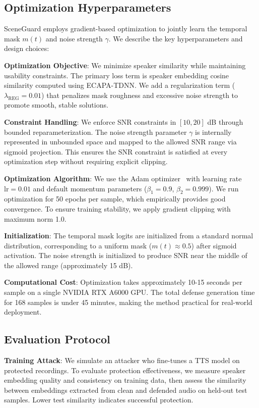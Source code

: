 \subsection{Optimization Hyperparameters}

SceneGuard employs gradient-based optimization to jointly learn the temporal mask $m(t)$ and noise strength $\gamma$. We describe the key hyperparameters and design choices:

\textbf{Optimization Objective}: We minimize speaker similarity while maintaining usability constraints. The primary loss term is speaker embedding cosine similarity computed using ECAPA-TDNN. We add a regularization term ($\lambda_{\text{REG}} = 0.01$) that penalizes mask roughness and excessive noise strength to promote smooth, stable solutions.

\textbf{Constraint Handling}: We enforce SNR constraints in $[10, 20]$ dB through bounded reparameterization. The noise strength parameter $\gamma$ is internally represented in unbounded space and mapped to the allowed SNR range via sigmoid projection. This ensures the SNR constraint is satisfied at every optimization step without requiring explicit clipping.

\textbf{Optimization Algorithm}: We use the Adam optimizer~\citep{adam} with learning rate $\text{lr} = 0.01$ and default momentum parameters ($\beta_1 = 0.9$, $\beta_2 = 0.999$). We run optimization for 50 epochs per sample, which empirically provides good convergence. To ensure training stability, we apply gradient clipping with maximum norm 1.0.

\textbf{Initialization}: The temporal mask logits are initialized from a standard normal distribution, corresponding to a uniform mask ($m(t) \approx 0.5$) after sigmoid activation. The noise strength is initialized to produce SNR near the middle of the allowed range (approximately 15 dB).

\textbf{Computational Cost}: Optimization takes approximately 10-15 seconds per sample on a single NVIDIA RTX A6000 GPU. The total defense generation time for 168 samples is under 45 minutes, making the method practical for real-world deployment.

\subsection{Evaluation Protocol}

\textbf{Training Attack}: We simulate an attacker who fine-tunes a TTS model on protected recordings. To evaluate protection effectiveness, we measure speaker embedding quality and consistency on training data, then assess the similarity between embeddings extracted from clean and defended audio on held-out test samples. Lower test similarity indicates successful protection.

